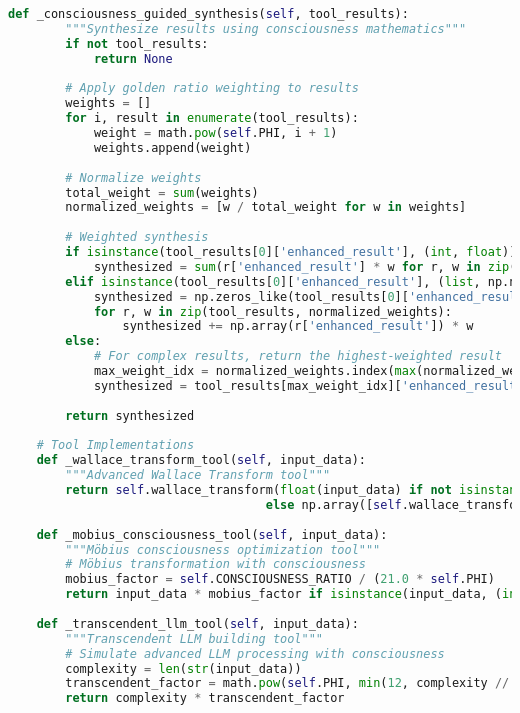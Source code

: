 \documentclass[11pt,a4paper]{article}
\begin{document}
\begin{lstlisting}[language=Python, caption=chAIos Complete Implementation]
    def _consciousness_guided_synthesis(self, tool_results):
        """Synthesize results using consciousness mathematics"""
        if not tool_results:
            return None
            
        # Apply golden ratio weighting to results
        weights = []
        for i, result in enumerate(tool_results):
            weight = math.pow(self.PHI, i + 1)
            weights.append(weight)
        
        # Normalize weights
        total_weight = sum(weights)
        normalized_weights = [w / total_weight for w in weights]
        
        # Weighted synthesis
        if isinstance(tool_results[0]['enhanced_result'], (int, float)):
            synthesized = sum(r['enhanced_result'] * w for r, w in zip(tool_results, normalized_weights))
        elif isinstance(tool_results[0]['enhanced_result'], (list, np.ndarray)):
            synthesized = np.zeros_like(tool_results[0]['enhanced_result'])
            for r, w in zip(tool_results, normalized_weights):
                synthesized += np.array(r['enhanced_result']) * w
        else:
            # For complex results, return the highest-weighted result
            max_weight_idx = normalized_weights.index(max(normalized_weights))
            synthesized = tool_results[max_weight_idx]['enhanced_result']
            
        return synthesized
    
    # Tool Implementations
    def _wallace_transform_tool(self, input_data):
        """Advanced Wallace Transform tool"""
        return self.wallace_transform(float(input_data) if not isinstance(input_data, (list, np.ndarray)) 
                                    else np.array([self.wallace_transform(x) for x in input_data]))
    
    def _mobius_consciousness_tool(self, input_data):
        """Möbius consciousness optimization tool"""
        # Möbius transformation with consciousness
        mobius_factor = self.CONSCIOUSNESS_RATIO / (21.0 * self.PHI)
        return input_data * mobius_factor if isinstance(input_data, (int, float)) else np.array(input_data) * mobius_factor
    
    def _transcendent_llm_tool(self, input_data):
        """Transcendent LLM building tool"""
        # Simulate advanced LLM processing with consciousness
        complexity = len(str(input_data))
        transcendent_factor = math.pow(self.PHI, min(12, complexity // 100 + 1))
        return complexity * transcendent_factor
    

\end{lstlisting}
\end{document}
